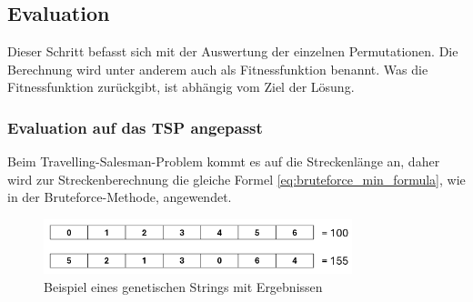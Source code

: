 %
%
%
%
\subsection{Evaluation
\label{buch:paper:varalg:subsection:evaluation}}
%
Dieser Schritt befasst sich mit der Auswertung der einzelnen 
Permutationen. Die Berechnung wird unter anderem auch als Fitnessfunktion benannt.
Was die Fitnessfunktion zurückgibt, ist abhängig vom Ziel der Lösung.

\subsubsection{Evaluation auf das TSP angepasst
\label{buch:paper:varalg:subsection:evaluation_tsp}}
Beim Travelling-Salesman-Problem kommt es auf die Streckenlänge an, 
daher wird zur Streckenberechnung die gleiche Formel \eqref{eq:bruteforce_min_formula},
wie in der Bruteforce-Methode, angewendet.
\begin{figure}
	\centering
	\includegraphics[width=0.8\textwidth]{
        papers/varalg/images/teil3/03GeneticStringCitiesResults.png
        }
	\caption{Beispiel eines genetischen Strings mit Ergebnissen}
	\label{fig:cities_genetic_string_results}
\end{figure}
